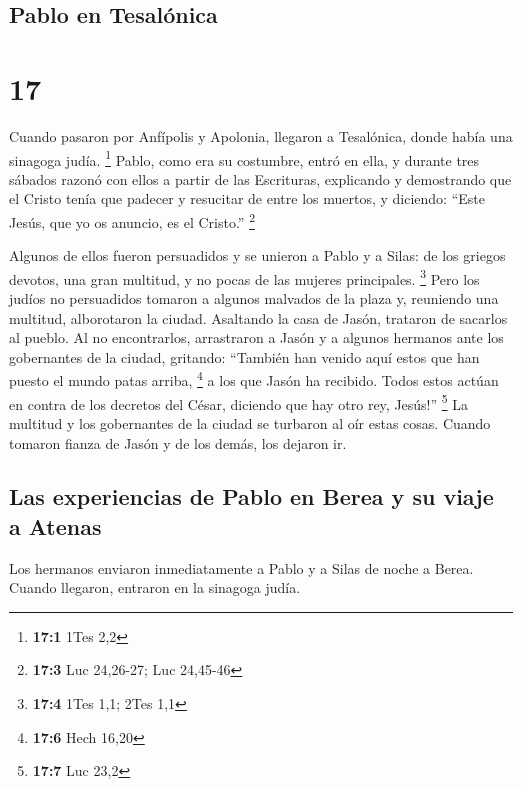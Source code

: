 \hypertarget{pablo-en-tesaluxf3nica}{%
\subsection{Pablo en Tesalónica}\label{pablo-en-tesaluxf3nica}}

\hypertarget{section-16}{%
\section{17}\label{section-16}}

 Cuando pasaron por Anfípolis y Apolonia, llegaron a
Tesalónica, donde había una sinagoga judía. \footnote{\textbf{17:1} 1Tes
  2,2}  Pablo, como era su costumbre, entró en ella, y
durante tres sábados razonó con ellos a partir de las Escrituras,
 explicando y demostrando que el Cristo tenía que padecer
y resucitar de entre los muertos, y diciendo: ``Este Jesús, que yo os
anuncio, es el Cristo.'' \footnote{\textbf{17:3} Luc 24,26-27; Luc
  24,45-46}

 Algunos de ellos fueron persuadidos y se unieron a Pablo
y a Silas: de los griegos devotos, una gran multitud, y no pocas de las
mujeres principales. \footnote{\textbf{17:4} 1Tes 1,1; 2Tes 1,1}
 Pero los judíos no persuadidos tomaron a algunos malvados
de la plaza y, reuniendo una multitud, alborotaron la ciudad. Asaltando
la casa de Jasón, trataron de sacarlos al pueblo.  Al no
encontrarlos, arrastraron a Jasón y a algunos hermanos ante los
gobernantes de la ciudad, gritando: ``También han venido aquí estos que
han puesto el mundo patas arriba, \footnote{\textbf{17:6} Hech 16,20}
 a los que Jasón ha recibido. Todos estos actúan en contra
de los decretos del César, diciendo que hay otro rey, Jesús!''
\footnote{\textbf{17:7} Luc 23,2}  La multitud y los
gobernantes de la ciudad se turbaron al oír estas cosas. 
Cuando tomaron fianza de Jasón y de los demás, los dejaron ir.

\hypertarget{las-experiencias-de-pablo-en-berea-y-su-viaje-a-atenas}{%
\subsection{Las experiencias de Pablo en Berea y su viaje a
Atenas}\label{las-experiencias-de-pablo-en-berea-y-su-viaje-a-atenas}}

 Los hermanos enviaron inmediatamente a Pablo y a Silas
de noche a Berea. Cuando llegaron, entraron en la sinagoga judía.

